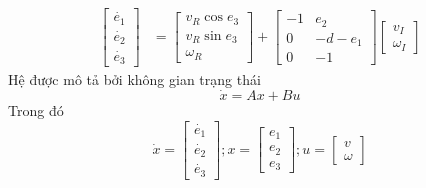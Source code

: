           \begin{align}
               \begin{bmatrix}
                    \dot{e_1} \\
                    \dot{e_2} \\
                    \dot{e_3}
                    \end{bmatrix} &= \begin{bmatrix}
                    v_R \cos e_3 \\
                    v_R \sin e_3 \\
                    \omega_R
                    \end{bmatrix} + \begin{bmatrix}
                    -1 & e_2 \\
                    0 & -d - e_1 \\
                    0 & -1
                    \end{bmatrix} \begin{bmatrix}
                    v_I \\
                    \omega_I
               \end{bmatrix}  
               \label{c6_e2}             
          \end{align}
          \hspace*{0.6cm}Hệ được mô tả bởi không gian trạng thái
          \begin{equation}
               \dot{x} = Ax + Bu 
               \label{c6_e3}
          \end{equation}
          \hspace*{0.6cm}Trong đó
          \begin{equation*}
               \dot{x} = \begin{bmatrix}
                    \dot{e_1} \\
                    \dot{e_2} \\
                    \dot{e_3}
               \end{bmatrix};
               x = \begin{bmatrix}
                    e_1 \\
                    e_2 \\
                    e_3
               \end{bmatrix}; 
               u = \begin{bmatrix}
                    v \\ 
                    \omega
               \end{bmatrix}
          \end{equation*}
